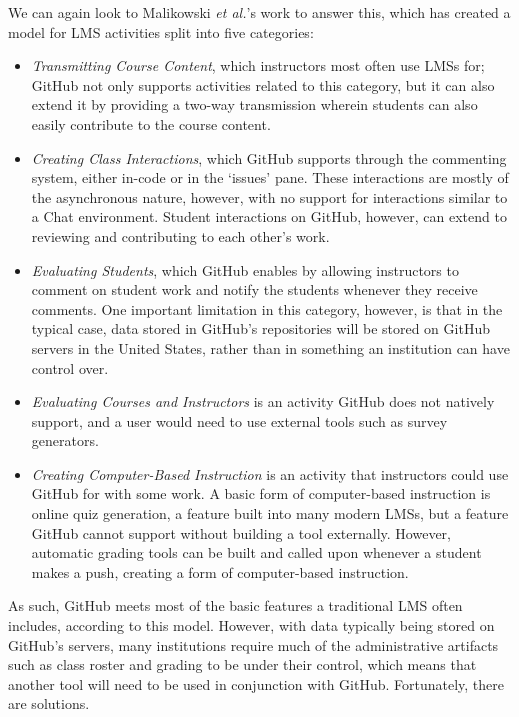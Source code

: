 We can again look to Malikowski \textit{et al.}'s \cite{malikowski2007model} work to answer this, which has created a model for LMS activities split into five categories:
\begin{itemize}
\item \emph{Transmitting Course Content}, which instructors most often use LMSs for; GitHub not only supports activities related to this category, but it can also extend it by providing a two-way transmission wherein students can also easily contribute to the course content.
\item \emph{Creating Class Interactions}, which GitHub supports through the commenting system, either in-code or in the `issues' pane. These interactions are mostly of the asynchronous nature, however, with no support for interactions similar to a Chat environment. Student interactions on GitHub, however, can extend to reviewing and contributing to each other's work.
\item \emph{Evaluating Students}, which GitHub enables by allowing instructors to comment on student work and notify the students whenever they receive comments. One important limitation in this category, however, is that in the typical case, data stored in GitHub's repositories will be stored on GitHub servers in the United States, rather than in something an institution can have control over.
\item \emph{Evaluating Courses and Instructors} is an activity GitHub does not natively support, and a user would need to use external tools such as survey generators.
\item \emph{Creating Computer-Based Instruction} is an activity that instructors could use GitHub for with some work. A basic form of computer-based instruction is online quiz generation, a feature built into many modern LMSs, but a feature GitHub cannot support without building a tool externally. However, automatic grading tools can be built and called upon whenever a student makes a push, creating a form of computer-based instruction.
\end{itemize}

As such, GitHub meets most of the basic features a traditional LMS often includes, according to this model. However, with data typically being stored on GitHub's servers, many institutions require much of the administrative artifacts such as class roster and grading to be under their control, which means that another tool will need to be used in conjunction with GitHub. Fortunately, there are solutions.

